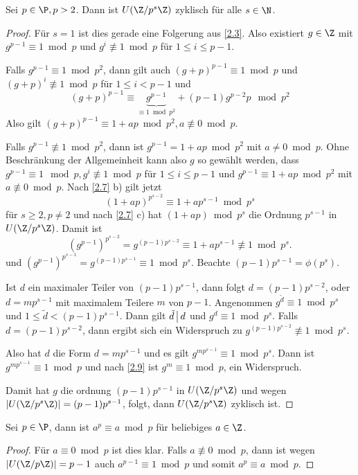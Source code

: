 \begin{st} \label{2.8}
	Sei $p \in \P, p > 2$.
	Dann ist $U(\Z / p^s \Z)$ zyklisch für alle $s \in \N$.
	\begin{proof}
		Für $s = 1$ ist dies gerade eine Folgerung aus \ref{2.3}.
		Also existiert $g \in \Z$ mit $g^{p-1} \equiv 1 \bmod p$ und $g^i \not\equiv 1 \bmod p$ für $1 \le i \le p -1$.

		Falls $g^{p-1} \equiv 1 \bmod p^2$, dann gilt auch $(g + p)^{p-1} \equiv 1 \bmod p$ und $(g + p)^i \not\equiv 1 \bmod p$ für $1 \le i < p-1$ und
		\[
			(g + p)^{p - 1} \equiv \underbrace{g^{p-1}}_{\equiv 1 \bmod p^2} + (p-1)g^{p-2} p \mod p^2
		\]
		Also gilt $(g + p)^{p-1} \equiv 1 + ap \bmod p^2, a \not\equiv 0 \bmod p$.

		Falls $g^{p-1} \not\equiv 1 \bmod p^2$, dann ist $g^{p-1} = 1 + ap \bmod p^2$ mit $a \neq 0 \bmod p$.
		Ohne Beschränkung der Allgemeinheit kann also $g$ so gewählt werden, dass $g^{p-1} \equiv 1 \mod p, g^i \not\equiv 1 \bmod p$ für $1 \le i \le p-1$ und $g^{p-1} \equiv 1 + ap \bmod p^2$ mit $a \not\equiv 0 \bmod p$.
		Nach \ref{2.7} b) gilt jetzt
		\[
			(1 + ap)^{p^{s-2}} \equiv 1 + ap^{s-1} \bmod p^s
		\]
		für $s \ge 2, p \neq 2$ und nach \ref{2.7} c) hat $(1 + ap) \bmod p^s$ die Ordnung $p^{s-1}$ in $U(\Z / p^s \Z)$.
		Damit ist
		\[
			(g^{p-1})^{p^{s-2}}
			= g^{(p-1)p^{s-2}}
			\equiv 1 + ap^{s-1}
			\not\equiv 1 \bmod p^s.
		\]
		und $(g^{p-1})^{p^{s-1}} = g^{(p-1)p^{s-1}} \equiv 1 \bmod p^s$.
		Beachte $(p-1)p^{s-1} = \phi(p^s)$.

		Ist $d$ ein maximaler Teiler von $(p-1)p^{s-1}$, dann folgt $d = (p-1)p^{s-2}$, oder $d = m p^{s-1}$ mit maximalem Teilere $m$ von $p-1$.
		Angenommen $g^{\tilde d} \equiv 1 \bmod p^s$ und $1 \le \tilde d < (p-1)p^{s-1}$.
		Dann gilt $\tilde d \divs d$ und $g^d \equiv 1 \bmod p^s$.
		Falls $d = (p-1)p^{s-2}$, dann ergibt sich ein Widerspruch zu $g^{(p-1)p^{s-2}} \not\equiv 1 \bmod p^s$.

		Also hat $d$ die Form $d = mp^{s-1}$ und es gilt $g^{mp^{s-1}} \equiv 1 \bmod p^s$.
		Dann ist $g^{mp^{s-1}} \equiv 1 \bmod p$ und nach \ref{2.9} ist $g^m \equiv 1 \bmod p$, ein Widerspruch.

		Damit hat $g$ die ordnung $(p-1)p^{s-1}$ in $U(\Z / p^s \Z)$ und wegen $|U(\Z / p^s \Z)| = (p-1)p^{s-1}$, folgt, dann $U(\Z / p^s \Z)$ zyklisch ist.
	\end{proof}
\end{st}

\begin{lem} \label{2.9}
	Sei $p \in \P$, dann ist $a^p \equiv a \bmod p$ für beliebiges $a \in \Z$.
	\begin{proof}
		Für $a \equiv 0 \bmod p$ ist dies klar.
		Falls $a \not\equiv 0 \bmod p$, dann ist wegen $|U(\Z / p\Z)| = p - 1$ auch $a^{p-1} \equiv 1 \bmod p$ und somit $a^p \equiv a \bmod p$.
	\end{proof}
\end{lem}

